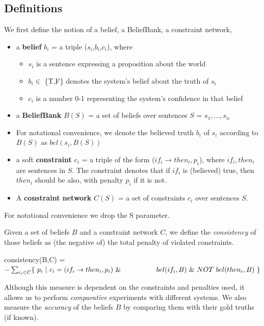 \documentclass[11pt]{article}
\newenvironment{myquote}{                   %
  \parskip 0mm \begin{quoting}[vskip=0mm,leftmargin=2mm]}{
\end{quoting}}
\newenvironment{ite}{                     %
     \parskip 0cm \begin{itemize} \parskip 0cm \parsep 0cm \itemsep 0cm \topsep 0cm}{
        \end{itemize}} %
\begin{document}

\subsection{Definitions \label{definitions}}

We first define the notion of a belief, a BeliefBank, a constraint network,



\begin{ite}
 \item a {\bf belief} $b_i$ = a triple ($s_i$,$b_i$,$c_i$), where
    \begin{ite}
     \item $s_i$ is a sentence expressing a proposition about the world
     \item $b_i \in$ \{T,F\} denotes the system's belief about the truth of $s_i$
     \item $c_i$ is a number 0-1 representing the system's confidence in that belief
    \end{ite}
 \item a {\bf BeliefBank} $B(S)$ = a set of beliefs over sentences $S$ = $s_1,...,s_n$
 \item For notational convenience, we denote the believed truth $b_i$ of $s_i$ according to $B(S)$ as $bel(s_i,B(S))$
 \item a soft {\bf constraint} $c_i$ = a triple of the form ($if_i \rightarrow then_i, p_i$),
   where $if_i, then_i$ are sentences in $S$. The constraint denotes
   that if $if_i$ is (believed) true, then $then_i$ should be also, with
   penalty $p_i$ if it is not.
 \item A {\bf constraint network} $C(S)$ = a set of constraints $c_i$ over sentences $S$.
\end{ite}
For notational convenience we drop the S parameter.

Given a set of beliefs $B$ and a constraint network $C$, we define the {\it consistency}
of those beliefs as (the negative of) the total penalty of violated constraints.
 \begin{myquote}
  consistency(B,C) = \\
\hspace*{2mm}  $- \sum_{c_i \in C} \{~ p_i ~ | ~ c_i = (if_i \rightarrow then_i, p_i )       ~\& \\
\hspace*{18mm}  bel(if_i,B) ~ \& ~ NOT~bel(then_i,B)~ \}$
\end{myquote}
Although this measure is dependent on the constraints and penalties used,
it allows us to perform {\it comparative} experiments with different systems.
We also measure the {\it accuracy} of the beliefs $B$ by comparing them
with their gold truths (if known).
\end{document}
